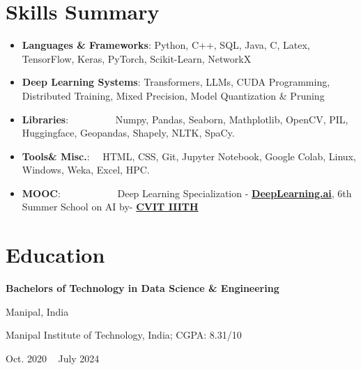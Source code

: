 \documentclass[a4paper,20pt]{article}
\newcommand{\resumeItem}[2]{
  \item\small{
    \textbf{#1}{: #2 \vspace{-2pt}}
  }
}
\newcommand{\resumeSubItem}[2]{\resumeItem{#1}{#2}\vspace{-3pt}}
\newcommand{\resumeSubHeadingListStart}{\begin{itemize}[leftmargin=*]}
\newcommand{\resumeItemListEnd}{\end{itemize}\vspace{-5pt}}
\begin{document}
\section{Skills Summary}
	\resumeSubHeadingListStart
	\resumeSubItem{Languages \& Frameworks}{Python, C++, SQL, Java, C, Latex, TensorFlow, Keras, PyTorch, Scikit-Learn, NetworkX}
	\resumeSubItem{Deep Learning Systems}{Transformers, LLMs, CUDA Programming, Distributed Training, Mixed Precision, Model Quantization \& Pruning}
	\resumeSubItem{Libraries}{~~~~~~~~~Numpy, Pandas, Seaborn, Mathplotlib, OpenCV, PIL, Huggingface, Geopandas, Shapely, NLTK, SpaCy.}
 \resumeSubItem{Tools\& Misc.}
    {~~HTML, CSS, Git, Jupyter Notebook, Google Colab, Linux, Windows, Weka, Excel, HPC. }
 \resumeSubItem{MOOC}{~~~~~~~~~~~Deep Learning Specialization - \href{https://www.coursera.org/account/accomplishments/specialization/certificate/73386Z863LW5}{\textbf{DeepLearning.ai}}, 6th Summer School on AI by- \href{https://drive.google.com/file/d/1o9630Dd7xtSDniDgnS1CQan38lRyjGtD/view?usp=sharing}{\textbf{CVIT IIITH}}}
\resumeItemListEnd

\section{Education}
    \begin{minipage}{.75\linewidth} \begin{flushleft}
    		\textbf{Bachelors of Technology in Data Science \& Engineering}
    	\end{flushleft} \end{minipage}
    \hfill 
    \begin{minipage}{.20\linewidth}\begin{flushright}
    	 Manipal, India
    	\end{flushright}\end{minipage}
    	
    	\begin{minipage}{.8\linewidth} \begin{flushleft}
    		Manipal Institute of Technology, India; CGPA: 8.31/10 \\
    	\end{flushleft} \end{minipage}
    \hfill 
    \begin{minipage}{.19\linewidth}\begin{flushright}
    	 Oct. 2020 ~ July 2024
    	\end{flushright}\end{minipage}
\end{document}
